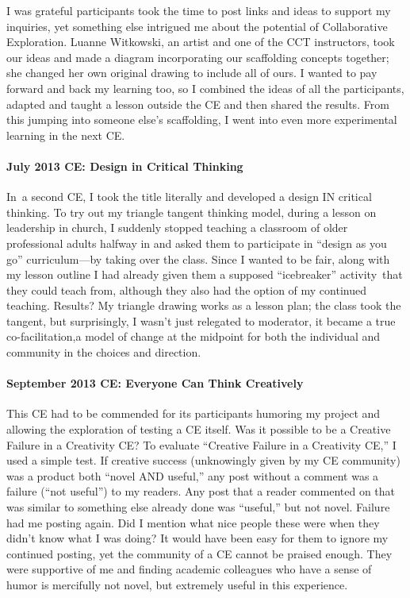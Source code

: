 I was grateful participants took the time to post links and ideas to
support my inquiries, yet something else intrigued me about the
potential of Collaborative Exploration. Luanne Witkowski, an artist and
one of the CCT instructors, took our ideas and made a diagram
incorporating our scaffolding concepts together; she changed her own
original drawing to include all of ours. I wanted to pay forward and
back my learning too, so I combined the ideas of all the participants,
adapted and taught a lesson outside the CE and then shared the results.
From this jumping into someone else's scaffolding, I went into even more
experimental learning in the next CE.

\hypertarget{july-2013-ce-design-in-critical-thinking}{%
\paragraph{July 2013 CE: Design in Critical
Thinking}\label{july-2013-ce-design-in-critical-thinking}}

In~a second CE, I took the title literally and developed a design IN
critical thinking. To try out my triangle tangent thinking model, during
a lesson on leadership in church, I suddenly stopped teaching a
classroom of older professional adults halfway in and asked them to
participate in ``design as you go'' curriculum---by taking over the
class. Since I wanted to be fair, along with my lesson outline I had
already given them a supposed ``icebreaker'' activity~that they could
teach from, although they also had the option of my continued teaching.
Results? My triangle drawing works as a lesson plan; the class took the
tangent, but surprisingly, I wasn't just relegated to moderator, it
became a true co-facilitation,a model of change at the midpoint for both
the individual and community in the choices and direction.

\hypertarget{september-2013-ce-everyone-can-think-creatively}{%
\paragraph{September 2013 CE: Everyone Can Think
Creatively}\label{september-2013-ce-everyone-can-think-creatively}}

This CE had to be commended for its participants humoring my project and
allowing the exploration of testing a CE itself. Was it possible to be a
Creative Failure in a Creativity CE? To evaluate ``Creative Failure in a
Creativity CE,'' I used a simple test. If creative success (unknowingly
given by my CE community) was a product both ``novel AND useful,'' any
post without a comment was a failure (``not useful'') to my readers. Any
post that a reader commented on that was similar to something else
already done was ``useful,'' but not novel. Failure had me posting
again. Did I mention what nice people these were when they didn't know
what I was doing? It would have been easy for them to ignore my
continued posting, yet the community of a CE cannot be praised enough.
They were supportive of me and finding academic colleagues who have a
sense of humor is mercifully not novel, but extremely useful in this
experience.

